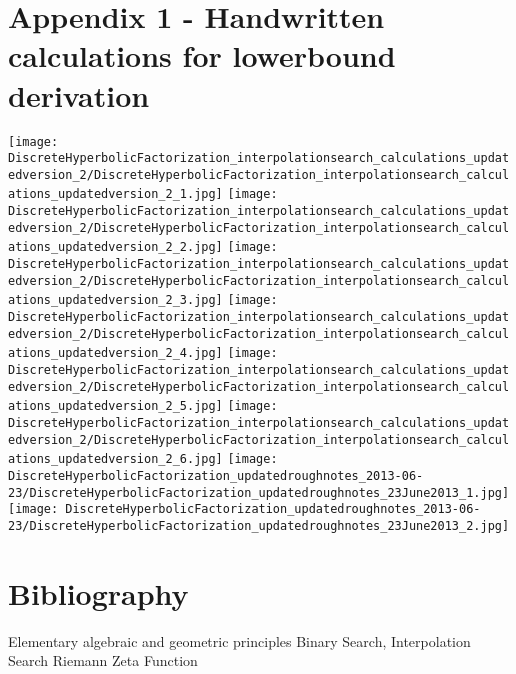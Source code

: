 \documentclass[11pt,onecolumn]{article}
\begin{document}
\section{Appendix 1 - Handwritten calculations for lowerbound derivation}
\texttt{[image: DiscreteHyperbolicFactorization\_interpolationsearch\_calculations\_updatedversion\_2/DiscreteHyperbolicFactorization\_interpolationsearch\_calculations\_updatedversion\_2\_1.jpg]} 
\texttt{[image: DiscreteHyperbolicFactorization\_interpolationsearch\_calculations\_updatedversion\_2/DiscreteHyperbolicFactorization\_interpolationsearch\_calculations\_updatedversion\_2\_2.jpg]} 
\texttt{[image: DiscreteHyperbolicFactorization\_interpolationsearch\_calculations\_updatedversion\_2/DiscreteHyperbolicFactorization\_interpolationsearch\_calculations\_updatedversion\_2\_3.jpg]} 
\texttt{[image: DiscreteHyperbolicFactorization\_interpolationsearch\_calculations\_updatedversion\_2/DiscreteHyperbolicFactorization\_interpolationsearch\_calculations\_updatedversion\_2\_4.jpg]} 
\texttt{[image: DiscreteHyperbolicFactorization\_interpolationsearch\_calculations\_updatedversion\_2/DiscreteHyperbolicFactorization\_interpolationsearch\_calculations\_updatedversion\_2\_5.jpg]} 
\texttt{[image: DiscreteHyperbolicFactorization\_interpolationsearch\_calculations\_updatedversion\_2/DiscreteHyperbolicFactorization\_interpolationsearch\_calculations\_updatedversion\_2\_6.jpg]} 
\texttt{[image: DiscreteHyperbolicFactorization\_updatedroughnotes\_2013-06-23/DiscreteHyperbolicFactorization\_updatedroughnotes\_23June2013\_1.jpg]} 
\texttt{[image: DiscreteHyperbolicFactorization\_updatedroughnotes\_2013-06-23/DiscreteHyperbolicFactorization\_updatedroughnotes\_23June2013\_2.jpg]} 
\section{Bibliography}
\begin{thebibliography}{99}
 Elementary algebraic and geometric principles
 Binary Search, Interpolation Search
 Riemann Zeta Function 
\end{thebibliography}
\end{document}
